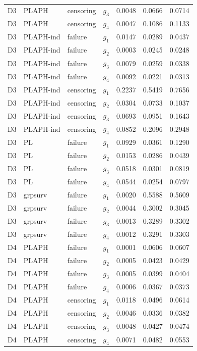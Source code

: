 \begin{longtable}{clllrrr}
D3 & PLAPH & censoring & $g_{3}$ & 0.0048 & 0.0666 & 0.0714 \\
D3 & PLAPH & censoring & $g_{4}$ & 0.0047 & 0.1086 & 0.1133 \\
D3 & PLAPH-ind & failure & $g_{1}$ & 0.0147 & 0.0289 & 0.0437 \\
D3 & PLAPH-ind & failure & $g_{2}$ & 0.0003 & 0.0245 & 0.0248 \\
D3 & PLAPH-ind & failure & $g_{3}$ & 0.0079 & 0.0259 & 0.0338 \\
D3 & PLAPH-ind & failure & $g_{4}$ & 0.0092 & 0.0221 & 0.0313 \\
D3 & PLAPH-ind & censoring & $g_{1}$ & 0.2237 & 0.5419 & 0.7656 \\
D3 & PLAPH-ind & censoring & $g_{2}$ & 0.0304 & 0.0733 & 0.1037 \\
D3 & PLAPH-ind & censoring & $g_{3}$ & 0.0693 & 0.0951 & 0.1643 \\
D3 & PLAPH-ind & censoring & $g_{4}$ & 0.0852 & 0.2096 & 0.2948 \\
D3 & PL & failure & $g_{1}$ & 0.0929 & 0.0361 & 0.1290 \\
D3 & PL & failure & $g_{2}$ & 0.0153 & 0.0286 & 0.0439 \\
D3 & PL & failure & $g_{3}$ & 0.0518 & 0.0301 & 0.0819 \\
D3 & PL & failure & $g_{4}$ & 0.0544 & 0.0254 & 0.0797 \\
D3 & grpsurv & failure & $g_{1}$ & 0.0020 & 0.5588 & 0.5609 \\
D3 & grpsurv & failure & $g_{2}$ & 0.0044 & 0.3002 & 0.3045 \\
D3 & grpsurv & failure & $g_{3}$ & 0.0013 & 0.3289 & 0.3302 \\
D3 & grpsurv & failure & $g_{4}$ & 0.0012 & 0.3291 & 0.3303 \\
D4 & PLAPH & failure & $g_{1}$ & 0.0001 & 0.0606 & 0.0607 \\
D4 & PLAPH & failure & $g_{2}$ & 0.0005 & 0.0423 & 0.0429 \\
D4 & PLAPH & failure & $g_{3}$ & 0.0005 & 0.0399 & 0.0404 \\
D4 & PLAPH & failure & $g_{4}$ & 0.0006 & 0.0367 & 0.0373 \\
D4 & PLAPH & censoring & $g_{1}$ & 0.0118 & 0.0496 & 0.0614 \\
D4 & PLAPH & censoring & $g_{2}$ & 0.0046 & 0.0336 & 0.0382 \\
D4 & PLAPH & censoring & $g_{3}$ & 0.0048 & 0.0427 & 0.0474 \\
D4 & PLAPH & censoring & $g_{4}$ & 0.0071 & 0.0482 & 0.0553 \\

\end{longtable}
